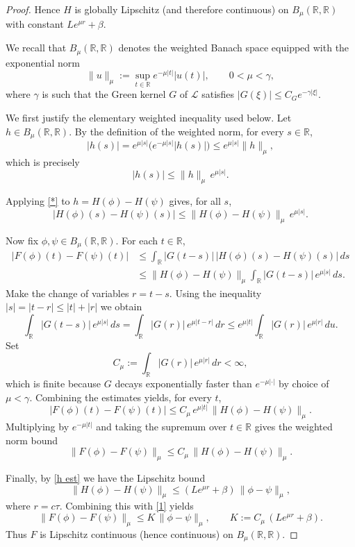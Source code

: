 \documentclass[12pt,letterpaper]{amsart}
\theoremstyle{definition}
\theoremstyle{remark}
\numberwithin{equation}{section}
\begin{document}
\begin{proof}
 	Hence $H$ is globally Lipschitz (and therefore continuous) on 
 	$B_\mu(\mathbb R,\mathbb R)$ with constant $L e^{\mu r}+\beta$.
 	
 	We recall that $B_\mu(\mathbb R,\mathbb R)$ denotes the weighted Banach space 
 	equipped with the exponential norm 
 	\[
 	\|u\|_\mu:=\sup_{t\in\mathbb R} e^{-\mu|t|}|u(t)|,
 	\qquad 0<\mu<\gamma,
 	\]
 	where $\gamma$ is such that the Green kernel $G$ of $\mathcal L$ satisfies
 	$|G(\xi)|\le C_G e^{-\gamma|\xi|}$.
 	
   	
 	We first justify the elementary weighted inequality used below.
 	Let $h\in B_\mu(\mathbb R,\mathbb R)$. By the definition of the weighted norm,
 	for every $s\in\mathbb R$,
 	\[
 	|h(s)| = e^{\mu|s|}\bigl(e^{-\mu|s|}|h(s)|\bigr) \le e^{\mu|s|}\|h\|_\mu,
 	\]
 	which is precisely
 \begin{equation} \label{*}	|h(s)| \le \|h\|_\mu\,e^{\mu|s|}.
 \end{equation}
 
 	Applying \eqref{*} to $h=H(\phi)-H(\psi)$ gives, for all $s$,
 	\[
 	|H(\phi)(s)-H(\psi)(s)| \le \|H(\phi)-H(\psi)\|_\mu\,e^{\mu|s|}.
 	\]
 	
 	Now fix $\phi,\psi\in B_\mu(\mathbb R,\mathbb R)$. For each $t\in\mathbb R$,
 	\[
 	\begin{aligned}
 		|F(\phi)(t)-F(\psi)(t)|
 		&\le \int_{\mathbb R} |G(t-s)|\,|H(\phi)(s)-H(\psi)(s)|\,ds\\
 		&\le \|H(\phi)-H(\psi)\|_\mu
 		\int_{\mathbb R} |G(t-s)|\,e^{\mu|s|}\,ds.
 	\end{aligned}
 	\]
 	Make the change of variables \(r=t-s\). Using the inequality \(|s|=|t-r|\le |t|+|r|\) we obtain
 	\[
 	\int_{\mathbb R} |G(t-s)|\,e^{\mu|s|}\,ds
 	= \int_{\mathbb R} |G(r)|\,e^{\mu|t-r|}\,dr
 	\le e^{\mu|t|}\int_{\mathbb R} |G(r)|\,e^{\mu|r|}\,du.
 	\]
 	Set
 	\[
 	C_\mu:=\int_{\mathbb R} |G(r)|\,e^{\mu|r|}\,dr <\infty,
 	\]
 	which is finite because $G$ decays exponentially faster than $e^{-\mu|\cdot|}$ by choice of $\mu<\gamma$.
 	Combining the estimates yields, for every $t$,
 	\[
 	|F(\phi)(t)-F(\psi)(t)| \le C_\mu\,e^{\mu|t|}\,\|H(\phi)-H(\psi)\|_\mu.
 	\]
 	Multiplying by $e^{-\mu|t|}$ and taking the supremum over $t\in\mathbb R$ gives the weighted norm bound
 \begin{equation}
 	\|F(\phi)-F(\psi)\|_\mu \le C_\mu\,\|H(\phi)-H(\psi)\|_\mu.
 \label{1}
 \end{equation}
  
 	
 	Finally, by \eqref{h est} we have the Lipschitz bound
 	\[
 	\|H(\phi)-H(\psi)\|_\mu \le (L e^{\mu r} + \beta)\,\|\phi-\psi\|_\mu,
 	\]
 	where $r=c\tau$. Combining this with \eqref{1} yields
 	\[
 	\|F(\phi)-F(\psi)\|_\mu \le K\,\|\phi-\psi\|_\mu,
 	\qquad K:=C_\mu\,(L e^{\mu r}+\beta).
 	\]
 	Thus $F$ is Lipschitz continuous (hence continuous) on $B_\mu(\mathbb R,\mathbb R)$. 
 	

\end{proof}
\end{document}
